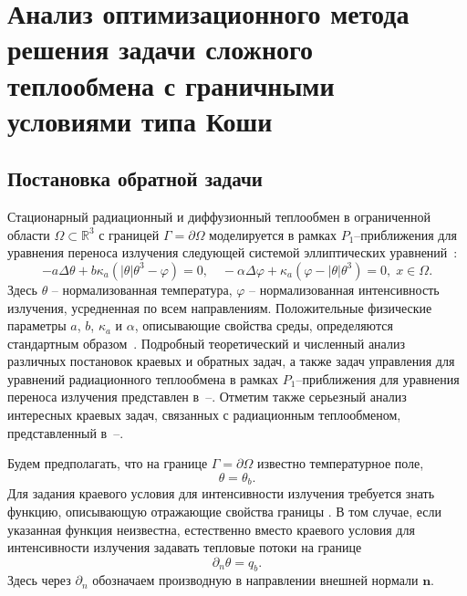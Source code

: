 \section{Анализ оптимизационного метода решения
задачи сложного теплообмена с граничными условиями типа
Коши}\label{sec:ch2/sec2}

\subsection{Постановка обратной задачи}\label{subsec:ch2/sec2/subsec1}

Стационарный радиационный и диффузионный теплообмен в
ограниченной области $\Omega\subset \mathbb{R}^3$ с границей
$\Gamma=\partial\Omega$ моделируется в рамках $P_1$--приближения для уравнения
переноса излучения следующей системой эллиптических
уравнений~\cite{Pinnau07,AMC-13,Kovt14-1}:
\begin{equation}
    \label{eq1}
    - a\Delta\theta + b\kappa_a(|\theta|\theta^3- \varphi)=0,   \quad
    -\alpha \Delta \varphi + \kappa_a(\varphi-|\theta|\theta^3)=0,\; x\in\Omega.
\end{equation}
Здесь $\theta$ -- нормализованная температура, $\varphi$ --
нормализованная интенсивность излучения, усредненная по всем
направлениям.
Положительные физические параметры
$a$, $b$, $\kappa_a$ и $\alpha$, описывающие
свойства среды, определяются стандартным образом~\cite{Kovt14-1}.
Подробный теоретический и численный анализ различных постановок
краевых и обратных задач, а также задач управления
для уравнений радиационного теплообмена
в рамках $P_1$--приближения для уравнения
переноса излучения представлен в~\cite{Pinnau07}--\cite{CMMP20}.
Отметим также серьезный анализ интересных краевых задач, связанных с радиационным теплообменом,
представленный в~\cite{Amosov05}--\cite{Amosov20}.

Будем предполагать, что на границе $\Gamma = \partial \Omega$ известно температурное поле,
\begin{equation}
    \label{bc1} \theta = \theta_b.
\end{equation}
Для задания краевого условия для интенсивности излучения
требуется знать функцию, описывающую отражающие свойства границы \cite{JVM-14}.
В том случае, если указанная функция неизвестна, естественно вместо
краевого условия для интенсивности излучения задавать тепловые потоки на границе
\begin{equation}
    \label{bc2} \partial_n\theta = q_b.
\end{equation}
Здесь через $\partial_n$ обозначаем производную в направлении
внешней нормали $\mathbf n$.

